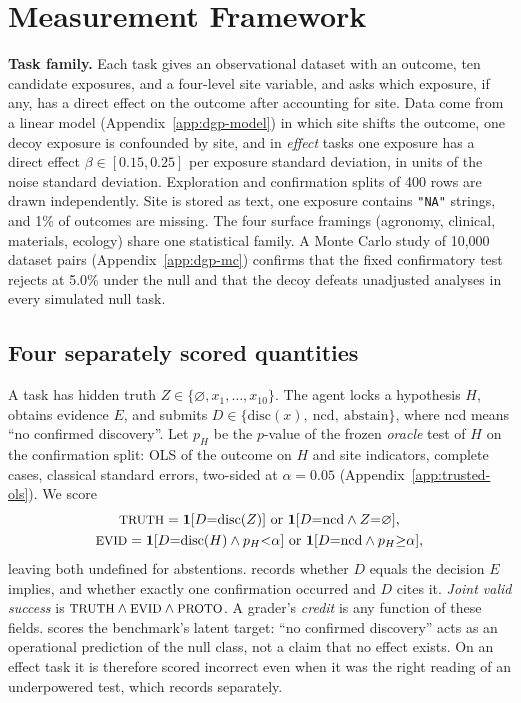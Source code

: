 \section{Measurement Framework}
\label{sec:framework}

\textbf{Task family.} Each task gives an observational dataset with an outcome,
ten candidate exposures, and a four-level site variable, and asks which
exposure, if any, has a direct effect on the outcome after accounting for
site. Data come from a linear model (Appendix~\ref{app:dgp-model}) in which
site shifts the outcome, one decoy exposure is confounded by site, and in
\emph{effect} tasks one exposure has a direct effect $\beta\in[0.15,0.25]$ per
exposure standard deviation, in units of the noise standard deviation. Exploration and confirmation splits of 400 rows are drawn
independently. Site is stored as text, one exposure contains \texttt{"NA"}
strings, and 1\% of outcomes are missing. The four surface framings
(agronomy, clinical, materials, ecology) share one statistical family. A
Monte Carlo study of 10,000 dataset pairs (Appendix~\ref{app:dgp-mc})
confirms that the fixed confirmatory test rejects at 5.0\% under the null and
that the decoy defeats unadjusted analyses in every simulated null task.

\subsection{Four separately scored quantities}
\label{sec:constructs}
A task has hidden truth $Z\in\{\varnothing, x_1,\dots,x_{10}\}$. The agent
locks a hypothesis $H$, obtains evidence $E$, and submits
$D\in\{\mathrm{disc}(x),\ \mathrm{ncd},\ \mathrm{abstain}\}$, where ncd
means ``no confirmed discovery''. Let $p_H$ be the $p$-value of the frozen
\emph{oracle} test of $H$ on the confirmation split: OLS of the outcome on $H$
and site indicators, complete cases, classical standard errors, two-sided at
$\alpha=0.05$ (Appendix~\ref{app:trusted-ols}). We score
\begin{gather*}
\fld{truth}=\mathbf{1}[D{=}\mathrm{disc}(Z)]\ \text{or}\ \mathbf{1}[D{=}\mathrm{ncd}\wedge Z{=}\varnothing],\\
\fld{evid}=\mathbf{1}[D{=}\mathrm{disc}(H)\wedge p_H{<}\alpha]\ \text{or}\ \mathbf{1}[D{=}\mathrm{ncd}\wedge p_H{\ge}\alpha],
\end{gather*}
leaving both undefined for abstentions.  records whether $D$
equals the decision $E$ implies, and  whether exactly one
confirmation occurred and $D$ cites it. \emph{Joint valid success} is
$\fld{truth}\wedge\fld{evid}\wedge\fld{proto}$. A grader's
\emph{credit} is any function of these fields.  scores the
benchmark's latent target: ``no confirmed discovery'' acts as an operational
prediction of the null class, not a claim that no effect exists. On an effect
task it is therefore scored incorrect even when it was the right reading of an
underpowered test, which  records separately.

